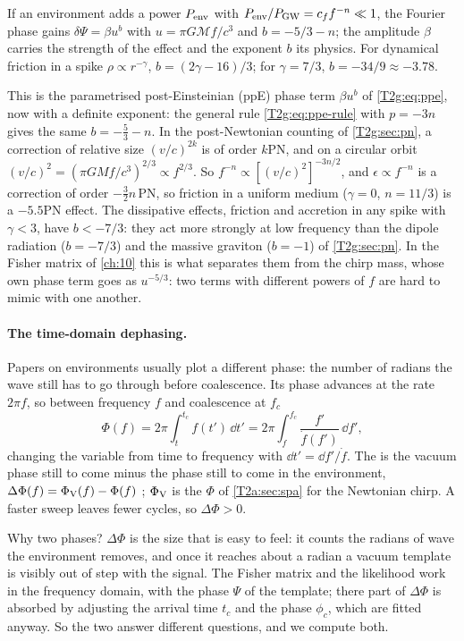 \begin{keyidea}
If an environment adds a power $P_{\rm env}$ with $P_{\rm env}/P_{\rm GW}=c_ff^{-n}\ll1$, the Fourier phase gains $\delta\Psi=\beta u^b$ with $u=\pi G\mathcal Mf/c^3$ and $b=-5/3-n$; the amplitude $\beta$ carries the strength of the effect and the exponent $b$ its physics. For dynamical friction in a spike $\rho\propto r^{-\gamma}$, $b=(2\gamma-16)/3$; for $\gamma=7/3$, $b=-34/9\approx-3.78$.
\end{keyidea}

This is the parametrised post-Einsteinian (ppE) phase term $\beta u^b$ of \eqref{T2g:eq:ppe}, now with a definite exponent: the general rule \eqref{T2g:eq:ppe-rule} with $p=-3n$ gives the same $b=-\tfrac53-n$. In the post-Newtonian counting of \cref{T2g:sec:pn}, a correction of relative size $(v/c)^{2k}$ is of order $k$PN, and on a circular orbit $(v/c)^2=(\pi GMf/c^3)^{2/3}\propto f^{2/3}$. So $f^{-n}\propto[(v/c)^2]^{-3n/2}$, and $\epsilon\propto f^{-n}$ is a correction of order $-\tfrac32n$\,PN, so friction in a uniform medium ($\gamma=0$, $n=11/3$) is a $-5.5$PN effect. The dissipative effects, friction and accretion in any spike with $\gamma<3$, have $b<-7/3$: they act more strongly at low frequency than the dipole radiation ($b=-7/3$) and the massive graviton ($b=-1$) of \cref{T2g:sec:pn}. In the Fisher matrix of \cref{ch:10} this is what separates them from the chirp mass, whose own phase term goes as $u^{-5/3}$: two terms with different powers of $f$ are hard to mimic with one another.

\paragraph{The time-domain dephasing.}
Papers on environments usually plot a different phase: the number of radians the wave still has to go through before coalescence. Its phase advances at the rate $2\pi f$, so between frequency $f$ and coalescence at $f_c$
\[
  \Phi(f)=2\pi\int_t^{t_c}f(t')\,\dd t'=2\pi\int_f^{f_c}\frac{f'}{\dot f(f')}\,\dd f',
\]
changing the variable from time to frequency with $\dd t'=\dd f'/\dot f$. The  is the vacuum phase still to come minus the phase still to come in the environment, $\Delta\Phi(f)=\Phi_{\rm V}(f)-\Phi(f)$ \cite[eq.~(49)]{Kim2023}; $\Phi_{\rm V}$ is the $\Phi$ of \cref{T2a:sec:spa} for the Newtonian chirp. A faster sweep leaves fewer cycles, so $\Delta\Phi>0$.

Why two phases? $\Delta\Phi$ is the size that is easy to feel: it counts the radians of wave the environment removes, and once it reaches about a radian a vacuum template is visibly out of step with the signal. The Fisher matrix and the likelihood work in the frequency domain, with the phase $\Psi$ of the template; there part of $\Delta\Phi$ is absorbed by adjusting the arrival time $t_c$ and the phase $\phi_c$, which are fitted anyway. So the two answer different questions, and we compute both.

